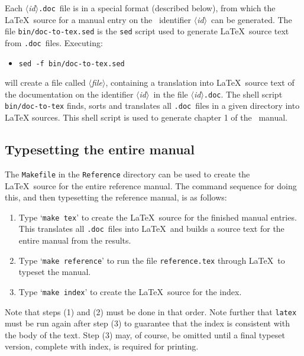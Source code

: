 \documentclass[12pt]{article}
\def\id{{$\langle${\it id\/}$\rangle$}}
\def\file{{$\langle${\it file}$\rangle$}}
\def\doc{{\tt .doc}}
\def\bnum#1{{\raise0.6pt\hbox{(}#1\raise0.6pt\hbox{)}}}
\def\latex{{\LaTeX}}
\def\sp{\hspace*{3.5mm}}
\begin{document}
Each \id\doc\ file is in a special format (described below), from which the
\latex\ source for a manual entry on the \ML\ identifier \id\ can be generated.
The file {\tt bin/doc-to-tex.sed} is the {\tt sed} script used to generate \latex\
source text from \doc\ files. Executing:

\begin{itemize}
\item {\tt sed -f bin/doc-to-tex.sed}\sp  \id\doc\sp {\tt >}\sp \file
\end{itemize}

\noindent will create a file called \file, containing a translation into
\latex\ source text of the documentation on the identifier \id\ in the file
\id\doc.  The shell script {\tt bin/doc-to-tex} finds, sorts and translates all
\doc\ files in a given directory into LaTeX sources. This shell script is used
to generate chapter 1 of the \REFERENCE\ manual.

\subsection{Typesetting the entire manual}\label{ref-make}

The {\tt Makefile} in the {\tt Reference} directory can be used to create the
\latex\ source for the entire reference manual.  The command sequence for
doing this, and then typesetting the reference manual, is as follows:

\begin{enumerate}

\item Type `{\tt make tex}' to create the \latex\ source for the finished
manual entries.  This translates all \doc\ files into \latex\ and builds a
source text for the entire manual from the results.

\item Type `{\tt make reference}' to run the file {\tt reference.tex} through
\latex\ to typeset the manual.

\item Type `{\tt make index}' to create the \latex\ source for the index.

\end{enumerate}

\noindent Note that steps \bnum{1} and \bnum{2} must be done in that order.
Note further that {\tt latex} must be run again after step \bnum{3} to
guarantee that the index is consistent with the body of the text. Step \bnum{3}
may, of course, be omitted until a final typeset version, complete with index,
is required for printing.
\end{document}
